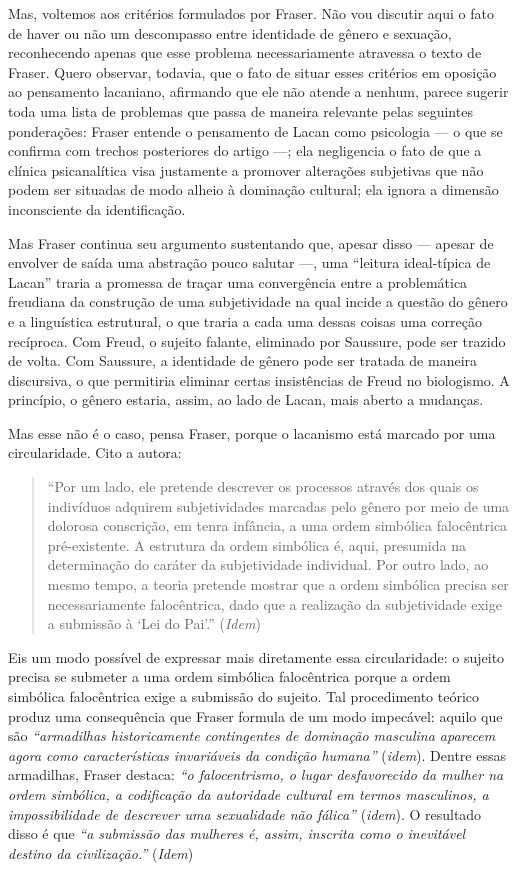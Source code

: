 Mas, voltemos aos critérios formulados por Fraser. Não vou discutir aqui
o fato de haver ou não um descompasso entre identidade de gênero e
sexuação, reconhecendo apenas que esse problema necessariamente
atravessa o texto de Fraser. Quero observar, todavia, que o fato de
situar esses critérios em oposição ao pensamento lacaniano, afirmando
que ele não atende a nenhum, parece sugerir toda uma lista de problemas
que passa de maneira relevante pelas seguintes ponderações: Fraser
entende o pensamento de Lacan como psicologia --- o que se confirma com
trechos posteriores do artigo ---; ela negligencia o fato de que a
clínica psicanalítica visa justamente a promover alterações subjetivas
que não podem ser situadas de modo alheio à dominação cultural; ela
ignora a dimensão inconsciente da identificação.

Mas Fraser continua seu argumento sustentando que, apesar disso ---
apesar de envolver de saída uma abstração pouco salutar ---, uma
``leitura ideal-típica de Lacan'' traria a promessa de traçar uma
convergência entre a problemática freudiana da construção de uma
subjetividade na qual incide a questão do gênero e a linguística
estrutural, o que traria a cada uma dessas coisas uma correção
recíproca. Com Freud, o sujeito falante, eliminado por Saussure, pode
ser trazido de volta. Com Saussure, a identidade de gênero pode ser
tratada de maneira discursiva, o que permitiria eliminar certas
insistências de Freud no biologismo. A princípio, o gênero estaria,
assim, ao lado de Lacan, mais aberto a mudanças.

Mas esse não é o caso, pensa Fraser, porque o lacanismo está marcado por
uma circularidade. Cito a autora:

\begin{quote}
``Por um lado, ele pretende descrever os processos através dos quais os
indivíduos adquirem subjetividades marcadas pelo gênero por meio de uma
dolorosa conscrição, em tenra infância, a uma ordem simbólica
falocêntrica pré-existente. A estrutura da ordem simbólica é, aqui,
presumida na determinação do caráter da subjetividade individual. Por
outro lado, ao mesmo tempo, a teoria pretende mostrar que a ordem
simbólica precisa ser necessariamente falocêntrica, dado que a
realização da subjetividade exige a submissão à `Lei do Pai'.''
(\emph{Idem})
\end{quote}

Eis um modo possível de expressar mais diretamente essa circularidade: o
sujeito precisa se submeter a uma ordem simbólica falocêntrica porque a
ordem simbólica falocêntrica exige a submissão do sujeito. Tal
procedimento teórico produz uma consequência que Fraser formula de um
modo impecável: aquilo que são \emph{``armadilhas historicamente
contingentes de dominação masculina aparecem agora como características
invariáveis da condição humana''} (\emph{idem}). Dentre essas
armadilhas, Fraser destaca: \emph{``o falocentrismo, o lugar
desfavorecido da mulher na ordem simbólica, a codificação da autoridade
cultural em termos masculinos, a impossibilidade de descrever uma
sexualidade não fálica''} (\emph{idem}). O resultado disso é que
\emph{``a submissão das mulheres é, assim, inscrita como o inevitável
destino da civilização.''} (\emph{Idem})

